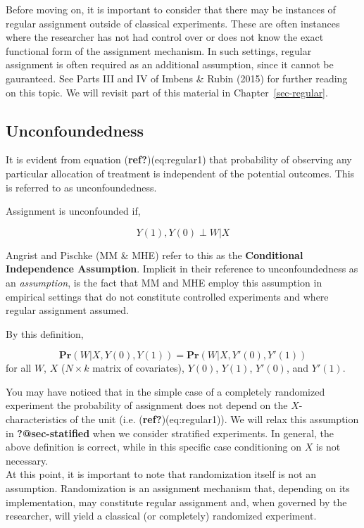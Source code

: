 \documentclass[
  letterpaper,
  DIV=11,
  numbers=noendperiod]{scrreprt}
\theoremstyle{definition}
\theoremstyle{remark}
\begin{document}
Before moving on, it is important to consider that there may be
instances of regular assignment outside of classical experiments. These
are often instances where the researcher has not had control over or
does not know the exact functional form of the assignment mechanism. In
such settings, regular assignment is often required as an additional
assumption, since it cannot be gauranteed. See Parts III and IV of
Imbens \& Rubin (2015) for further reading on this topic. We will
revisit part of this material in Chapter~\ref{sec-regular}.

\subsection{Unconfoundedness}\label{unconfoundedness}

It is evident from equation (\textbf{ref?})(eq:regular1) that
probability of observing any particular allocation of treatment is
independent of the potential outcomes. This is referred to as
unconfoundedness.

\begin{tcolorbox}[enhanced jigsaw, bottomrule=.15mm, coltitle=black, arc=.35mm, left=2mm, opacityback=0, leftrule=.75mm, colbacktitle=quarto-callout-note-color!10!white, title={Note}, toprule=.15mm, bottomtitle=1mm, breakable, colframe=quarto-callout-note-color-frame, opacitybacktitle=0.6, titlerule=0mm, colback=white, rightrule=.15mm, toptitle=1mm]

Assignment is unconfounded if,

\[
 Y(1),Y(0)\perp W|X
\]

\end{tcolorbox}

Angrist and Pischke (MM \& MHE) refer to this as the \textbf{Conditional
Independence Assumption}. Implicit in their reference to
unconfoundedness as an \emph{assumption}, is the fact that MM and MHE
employ this assumption in empirical settings that do not constitute
controlled experiments and where regular assignment assumed.

By this definition,

\[
      \mathbf{Pr}(W|X, Y(0),Y(1))=\mathbf{Pr}(W|X,Y'(0),Y'(1))
\] for all \(W\), \(X\) (\(N\times k\) matrix of covariates), \(Y(0)\),
\(Y(1)\), \(Y'(0)\), and \(Y'(1)\).

You may have noticed that in the simple case of a completely randomized
experiment the probability of assignment does not depend on the
\(X\)-characteristics of the unit (i.e. (\textbf{ref?})(eq:regular1)).
We will relax this assumption in \textbf{?@sec-statified} when we
consider stratified experiments. In general, the above definition is
correct, while in this specific case conditioning on \(X\) is not
necessary.\\
At this point, it is important to note that randomization itself is not
an assumption. Randomization is an assignment mechanism that, depending
on its implementation, may constitute regular assignment and, when
governed by the researcher, will yield a classical (or completely)
randomized experiment.
\end{document}
